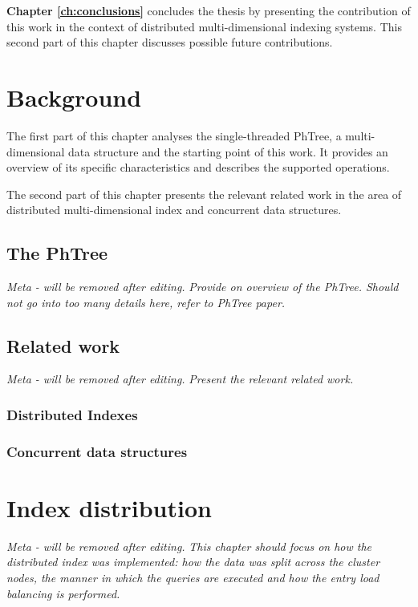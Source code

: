 \documentclass[11pt,a4paper]{globis-book}
\begin{document}
\textbf{Chapter \ref{ch:conclusions}} concludes the thesis by presenting the contribution of this work in the context of distributed multi-dimensional indexing systems. This second part of this chapter discusses possible future contributions.

\chapter{Background}
\label{ch:background}
The first part of this chapter analyses the single-threaded PhTree, a multi-dimensional data structure and the starting point of this work. It provides an overview of its specific characteristics and describes the supported operations.

The second part of this chapter presents the relevant related work in the area of distributed multi-dimensional index and concurrent data structures. 

\section{The PhTree}
\label{sec:background-phtree}

\textit{Meta - will be removed after editing.}
\textit{Provide on overview of the PhTree. Should not go into too many details here, refer to PhTree paper.}

\section{Related work}
\label{sec:background-rw}

\textit{Meta - will be removed after editing.}
\textit{Present the relevant related work.}

\subsection{Distributed Indexes}

\subsection{Concurrent data structures}

\chapter{Index distribution}
\label{ch:distindex}

\textit{Meta - will be removed after editing.}
\textit{This chapter should focus on how the distributed index was implemented: how the data was split across the cluster nodes, the manner in which the queries are executed and how the entry load balancing is performed.} 
\end{document}
